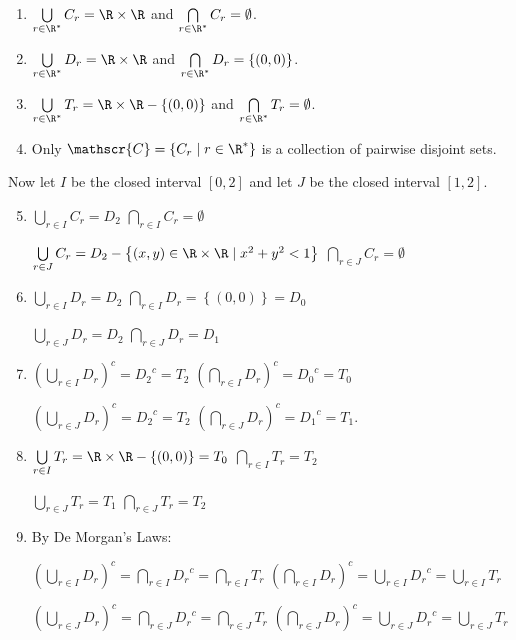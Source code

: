\documentclass[11pt]{article}
\begin{document}
\begin{enumerate}
\item $\bigcup\limits_{r \in \R^*}^{}C_r = \R \times \R$ \quad and \quad 
$\bigcap\limits_{r \in \R^*}^{}C_r = \emptyset$.

\item $\bigcup\limits_{r \in \R^*}^{}D_r = \R \times \R$ \quad and \quad 
$\bigcap\limits_{r \in \R^*}^{}D_r = \left\{ \left( 0, 0 \right) \right\}$.

\item $\bigcup\limits_{r \in \R^*}^{}T_r = \R \times \R - \left\{ \left( 0, 0 \right) \right\}$ \quad and \quad 
$\bigcap\limits_{r \in \R^*}^{}T_r = \emptyset$.

\item Only $\mathscr{C} = \left\{ C_r \mid r \in \R^* \right\}$ is a collection of pairwise disjoint sets.
\end{enumerate}

\noindent
Now let $I$ be the closed interval $[0, 2]$ and let $J$ be the closed interval $[1, 2]$.

\begin{enumerate} \setcounter{enumi}{4}
\item $\bigcup\limits_{r \in I}^{}C_r = D_2$ \qquad $\bigcap\limits_{r \in I}^{}C_r = \emptyset$

$\bigcup\limits_{r \in J}^{}C_r = D_2 - \left\{ (x, y) \in \R \times \R \mid x^2 + y^2 < 1 \right\}$ \qquad $\bigcap\limits_{r \in J}^{}C_r = \emptyset$

\item $\bigcup\limits_{r \in I}^{}D_r = D_2$ \qquad 
$\bigcap\limits_{r \in I}^{}D_r = \left\{ \left( 0, 0 \right) \right\} = D_0$

$\bigcup\limits_{r \in J}^{}D_r = D_2$ \qquad $\bigcap\limits_{r \in J}^{}D_r = D_1$


\item $\left( \bigcup\limits_{r \in I}^{}D_r \right)^c = {D_2}^c = T_2$ \qquad 
$\left( \bigcap\limits_{r \in I}^{}D_r \right)^c = {D_0}^c = T_0$
 
$\left( \bigcup\limits_{r \in J}^{}D_r \right)^c = {D_2}^c = T_2$ \qquad 
$\left( \bigcap\limits_{r \in J}^{}D_r \right)^c = {D_1}^c = T_1$.


\item $\bigcup\limits_{r \in I}^{}T_r = \R \times \R - \left\{ \left( 0, 0 \right) \right\} = T_0$ \qquad 
$\bigcap\limits_{r \in I}^{}T_r = T_2$

$\bigcup\limits_{r \in J}^{}T_r = T_1$ \qquad 
$\bigcap\limits_{r \in J}^{}T_r = T_2$


\item By De Morgan's Laws:

$\left( \bigcup\limits_{r \in I}^{}D_r \right)^c = \bigcap\limits_{r \in I}^{}{D_r}^c = \bigcap\limits_{r \in I}^{}T_r$ \qquad
$\left( \bigcap\limits_{r \in I}^{}D_r \right)^c = \bigcup\limits_{r \in I}^{}{D_r}^c = \bigcup\limits_{r \in I}^{}T_r$

$\left( \bigcup\limits_{r \in J}^{}D_r \right)^c = \bigcap\limits_{r \in J}^{}{D_r}^c = \bigcap\limits_{r \in J}^{}T_r$ \qquad
$\left( \bigcap\limits_{r \in J}^{}D_r \right)^c = \bigcup\limits_{r \in J}^{}{D_r}^c = \bigcup\limits_{r \in J}^{}T_r$
\end{enumerate}
\end{document}

